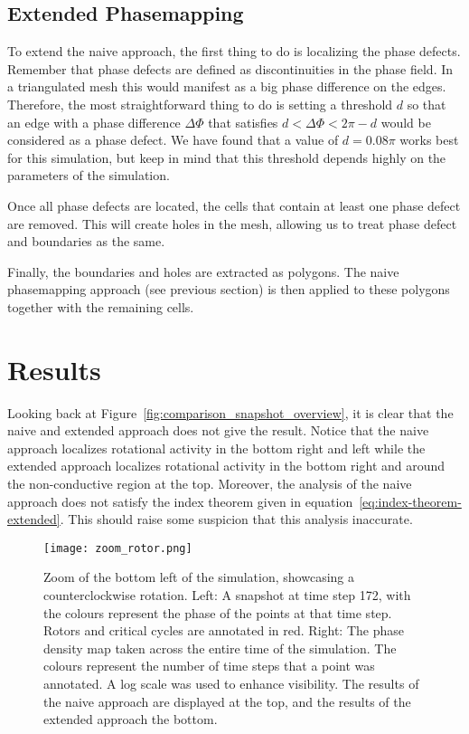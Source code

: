 \documentclass[twocolumn]{article}
\begin{document}
\subsection{Extended Phasemapping}\label{extended-phasemapping}

To extend the naive approach, the first thing to do is localizing the
phase defects. Remember that phase defects are defined as
discontinuities in the phase field. In a triangulated mesh this would
manifest as a big phase difference on the edges. Therefore, the most
straightforward thing to do is setting a threshold \(d\) so that an edge
with a phase difference \(\Delta\Phi\) that satisfies
\(d<\Delta\Phi<2\pi-d\) would be considered as a phase defect. We have
found that a value of \(d=0.08\pi\) works best for this simulation, but
keep in mind that this threshold depends highly on the parameters of the
simulation.

Once all phase defects are located, the cells that contain at least one
phase defect are removed. This will create holes in the mesh, allowing
us to treat phase defect and boundaries as the same.

Finally, the boundaries and holes are extracted as polygons. The naive
phasemapping approach (see previous section) is then applied to these
polygons together with the remaining cells.

\section{Results}\label{results}

Looking back at Figure~\ref{fig:comparison_snapshot_overview}, it is
clear that the naive
and extended approach does not give the result. Notice that the naive
approach localizes rotational activity in the bottom right and left
while the extended approach localizes rotational activity in the bottom
right and around the non-conductive region at the top. Moreover, the
analysis of the naive approach does not satisfy the index theorem given
in equation~\ref{eq:index-theorem-extended}. This should raise some
suspicion that this analysis
inaccurate.

\begin{figure}[ht]
  \centering
  \texttt{[image: zoom\_rotor.png]}
  \caption{Zoom of the bottom left of the simulation, showcasing a
    counterclockwise rotation. Left: A snapshot at time step 172, with the
    colours represent the phase of the points at that time step. Rotors and
    critical cycles are annotated in red. Right: The phase density map taken
    across the entire time of the simulation. The colours represent the
    number of time steps that a point was annotated. A log scale was used to
    enhance visibility. The results of the naive approach are displayed at
  the top, and the results of the extended approach the bottom.}
  \label{fig:zoom-rotor}
\end{figure}
\end{document}
